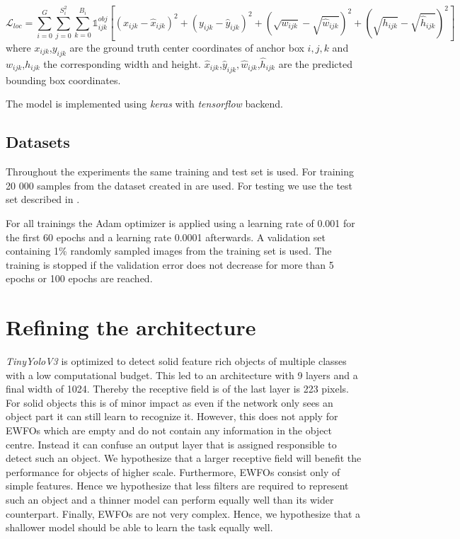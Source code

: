 	\begin{equation}
		\mathcal{L}_{loc} = \sum_{i=0}^{G} \sum_{j=0}^{S_i^2}\sum_{k=0}^{B_i} \mathbb{1}_{ijk}^{obj}[(x_{ijk}-\hat{x}_{ijk})^2 + (y_{ijk}-\hat{y}_{ijk})^2  + (\sqrt{w_{ijk}}-\sqrt{\hat{w}_{ijk}})^2 +(\sqrt{h_{ijk}}-\sqrt{\hat{h}_{ijk}})^2 ]
	\end{equation}
	where $x_{ijk}$,$y_{ijk}$ are the ground truth center coordinates of anchor box $i,j,k$ and $w_{ijk}$,$h_{ijk}$ the corresponding width and height. $\hat x_{ijk}$,$\hat y_{ijk}, \hat w_{ijk}$,$\hat h_{ijk}$ are the predicted bounding box coordinates. 
	
	The model is implemented using \textit{keras} with \textit{tensorflow} backend. 
	
	\subsection{Datasets}
	
	Throughout the experiments the same training and test set is used. For training 20 000 samples from the dataset created in  are used. For testing we use the test set described in .

	For all trainings the Adam optimizer is applied using a learning rate of 0.001 for the first 60 epochs and a learning rate 0.0001 afterwards. A validation set containing 1\% randomly sampled images from the training set is used. The training is stopped if the validation error does not decrease for more than 5 epochs or 100 epochs are reached.
	
	\section{Refining the architecture}
	
	\textit{TinyYoloV3} is optimized to detect solid feature rich objects of multiple classes with a low computational budget. This led to an architecture with 9 layers and a final width of 1024. Thereby the receptive field is of the last layer is 223 pixels. For solid objects this is of minor impact as even if the network only sees an object part it can still learn to recognize it. However, this does not apply for \acp{EWFO} which are empty and do not contain any information in the object centre. Instead it can confuse an output layer that is assigned responsible to detect such an object. We hypothesize that a larger receptive field will benefit the performance for objects of higher scale. Furthermore, \acp{EWFO} consist only of simple features. Hence we hypothesize that less filters are required to represent such an object and a thinner model can perform equally well than its wider counterpart. Finally, \acp{EWFO} are not very complex. Hence, we hypothesize that a shallower model should be able to learn the task equally well.
	
